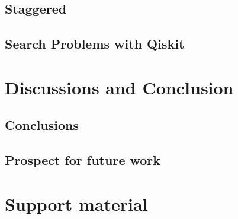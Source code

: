 \documentclass[
oneside,
11pt, a4paper,
footinclude=true,
headinclude=true,
cleardoublepage=empty
]{scrbook}
\begin{document}
\section{Staggered}
\section{Search Problems with Qiskit}


\chapter{Discussions and Conclusion}
\section{Conclusions}
\section{Prospect for future work}










\chapter{Support material}
\end{document}
